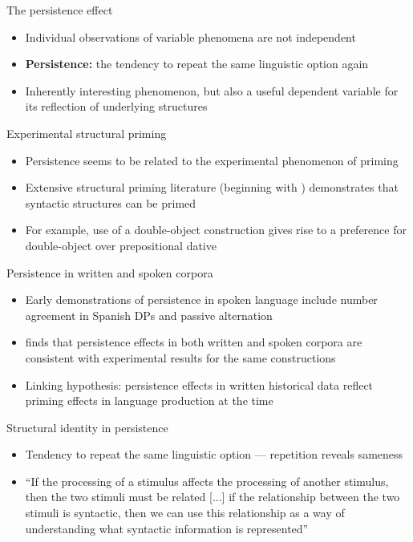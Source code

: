 \documentclass{digs-slides}
\begin{document}
\begin{frame}{The persistence effect}
	\begin{itemize}
          \item Individual observations of variable phenomena are not independent \parencite{Sankoff:1978}
		\item \textbf{Persistence:} the tendency to repeat the same linguistic option again
		\item Inherently interesting phenomenon, but also a useful dependent variable for its reflection of underlying structures
	\end{itemize}
\end{frame}

\begin{frame}{Experimental structural priming}
	\begin{itemize}
		\item Persistence seems to be related to the experimental phenomenon of priming
		\item Extensive structural priming literature (beginning with \textcite{Bock:1986}) demonstrates that syntactic structures can be primed
		\item For example, use of a double-object construction gives rise to a preference for double-object over prepositional dative
	\end{itemize}
\end{frame}

\begin{frame}{Persistence in written and spoken corpora}
	\begin{itemize}
          \item Early demonstrations of persistence in spoken language include number agreement in Spanish DPs \parencite{Poplack:1980} and passive alternation \parencite{Weiner:1983}
          \item \parencite{Gries:2005} finds that persistence effects in both written and spoken corpora are consistent with experimental results for the same constructions
		\item Linking hypothesis: persistence effects in written historical data reflect priming effects in language production at the time
	\end{itemize}
\end{frame}


\begin{frame}{Structural identity in persistence}
	\begin{itemize}
		\item Tendency to repeat the same linguistic option — repetition reveals sameness
		\item “If the processing of a stimulus affects the processing of another stimulus, then the two stimuli must be related [...] if the relationship between the two stimuli is syntactic, then we can use this relationship as a way of understanding what syntactic information is represented” \parencite[490]{Branigan:1995}
	\end{itemize}
\end{frame}
\end{document}
